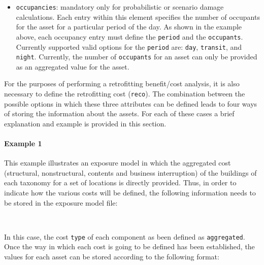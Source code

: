 \begin{itemize}
    \item \Verb+occupancies+: mandatory only for probabilistic or scenario 
    damage calculations. Each entry within this element specifies the number of
    occupants for the asset for a particular period of the day. As shown in 
    the example above, each occupancy entry must define the \Verb+period+ and 
    the \Verb+occupants+. Currently supported valid options for the 
    \Verb+period+ are: \Verb+day+, \Verb+transit+, and \Verb+night+. Currently,
    the number of \Verb+occupants+ for an asset can only be provided as an 
    aggregated value for the asset.

\end{itemize}

For the purposes of performing a retrofitting benefit/cost analysis, it
is also necessary to define the retrofitting cost (\Verb+reco+). The
combination between the possible options in which these three attributes can
be defined leads to four ways of storing the information about the assets. For
each of these cases a brief explanation and example is provided in this
section.


\paragraph{Example 1}

This example illustrates an \gls{exposure model} in which the aggregated
cost (structural, nonstructural, contents and business interruption) of the
buildings of each taxonomy for a set of locations is directly provided. Thus,
in order to indicate how the various costs will be defined, the following
information needs to be stored in the exposure model file:

\inputminted[firstline=8,firstnumber=8,lastline=18,fontsize=\footnotesize,frame=single,linenos,bgcolor=lightgray]{xml}{oqum/risk/Verbatim/input_exposure_cagg.xml}\\

In this case, the cost \Verb+type+ of each component as been defined as
\Verb+aggregated+. Once the way in which each cost is going to be defined has
been established, the values for each asset can be stored according to the
following format:

\inputminted[firstline=19,firstnumber=19,lastline=29,fontsize=\footnotesize,frame=single,linenos,bgcolor=lightgray]{xml}{oqum/risk/Verbatim/input_exposure_cagg.xml}\\

